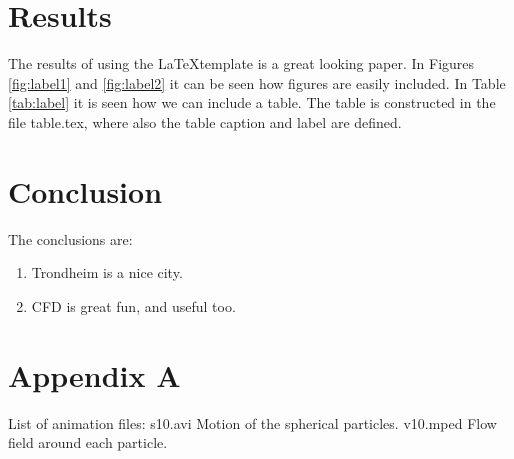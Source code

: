 \documentclass{CFD2011}
\begin{document}


\section{Results}
The results of using the \LaTeX template is a great looking paper.
In Figures \ref{fig:label1} and \ref{fig:label2} it can be seen how figures are easily included.
In Table \ref{tab:label} it is seen how we can include a table.
The table is constructed in the file table.tex, where also the table caption and label are defined.


\newpage
{}


\section{Conclusion}
The conclusions are:
\begin{enumerate}
  \item Trondheim is a nice city.
  \item CFD is great fun, and useful too.
\end{enumerate}

\newpage



   


\newpage
\section{Appendix A}
List of animation files:
s10.avi Motion of the spherical particles.
v10.mped Flow field around each particle.
\end{document}
